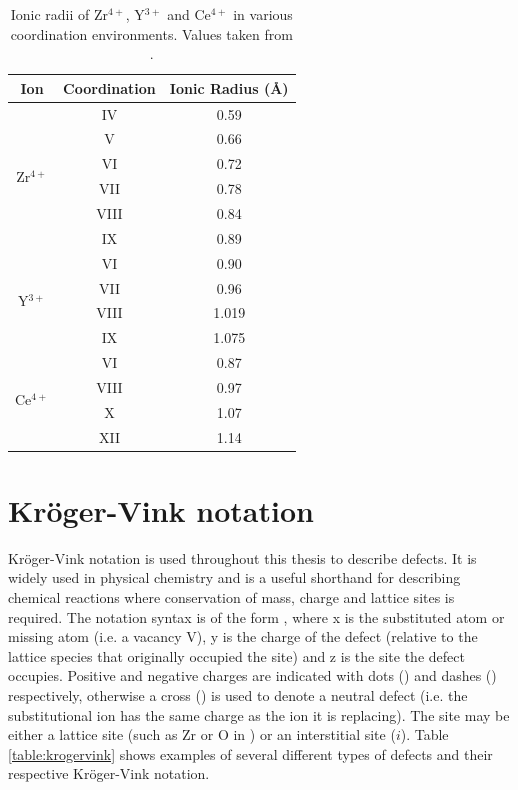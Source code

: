 \begin{table}[ht]
\onehalfspacing
\centering
\caption[Ionic radii of Zr$^{4+}$, Y$^{3+}$ and Ce$^{4+}$ in various coordination environments.]{Ionic radii of Zr$^{4+}$, Y$^{3+}$ and Ce$^{4+}$ in various coordination environments. Values taken from \cite{Shannon1976}.}
\label{figure:ionicradii}
\begin{tabular}{ccc}
\hline
Ion & Coordination & Ionic Radius (\r{A}) \\ \hline
\multicolumn{1}{c}{\multirow{6}{*}{Zr$^{4+}$}} & \multicolumn{1}{c}{IV} & 0.59 \\
\multicolumn{1}{c}{} & \multicolumn{1}{c}{V} & 0.66 \\
\multicolumn{1}{c}{} & \multicolumn{1}{c}{VI} & 0.72 \\
\multicolumn{1}{c}{} & \multicolumn{1}{c}{VII} & 0.78 \\
\multicolumn{1}{c}{} & \multicolumn{1}{c}{VIII} & 0.84 \\
\multicolumn{1}{c}{} & \multicolumn{1}{c}{IX} & 0.89 \\ \hline
\multicolumn{1}{c}{\multirow{4}{*}{Y$^{3+}$}} & \multicolumn{1}{c}{VI} & 0.90 \\
\multicolumn{1}{c}{} & \multicolumn{1}{c}{VII} & 0.96 \\
\multicolumn{1}{c}{} & \multicolumn{1}{c}{VIII} & 1.019 \\
\multicolumn{1}{c}{} & \multicolumn{1}{c}{IX} & 1.075 \\ \hline
\multicolumn{1}{c}{\multirow{4}{*}{Ce$^{4+}$}} & \multicolumn{1}{c}{VI} & 0.87 \\
\multicolumn{1}{c}{} & \multicolumn{1}{c}{VIII} & 0.97 \\
\multicolumn{1}{c}{} & \multicolumn{1}{c}{X} & 1.07 \\
\multicolumn{1}{c}{} & \multicolumn{1}{c}{XII} & 1.14 \\ \hline
\end{tabular}
\end{table}

\section{Kr\"{o}ger-Vink notation}

Kr\"{o}ger-Vink notation \cite{kroger1956relations} is used throughout this thesis to describe defects. It is widely used in physical chemistry and is a useful shorthand for describing chemical reactions where conservation of mass, charge and lattice sites is required. The notation syntax is of the form , where x is the substituted atom or missing atom (i.e. a vacancy V), y is the charge of the defect (relative to the lattice species that originally occupied the site) and z is the site the defect occupies. Positive and negative charges are indicated with dots (\ch{^{*}}) and dashes () respectively, otherwise a cross () is used to denote a neutral defect (i.e. the substitutional ion has the same charge as the ion it is replacing). The site may be either a lattice site (such as Zr or O in \zirconia ) or an interstitial site ($i$). Table \ref{table:krogervink} shows examples of several different types of defects and their respective Kr\"{o}ger-Vink notation.

